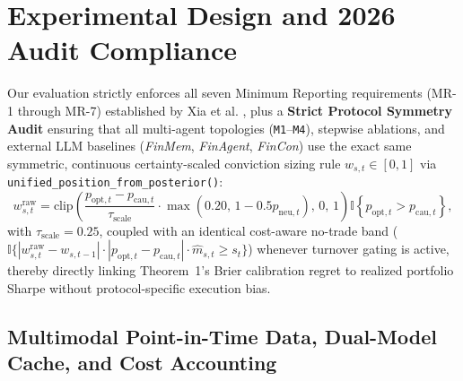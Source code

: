 \documentclass[10pt,a4paper,twocolumn]{article}
\begin{document}
\section{Experimental Design and 2026 Audit Compliance}

Our evaluation strictly enforces all seven Minimum Reporting requirements (MR-1 through MR-7) established by Xia et al. \cite{xia2026audit}, plus a \textbf{Strict Protocol Symmetry Audit} ensuring that all multi-agent topologies (\texttt{M1}--\texttt{M4}), stepwise ablations, and external LLM baselines (\textit{FinMem}, \textit{FinAgent}, \textit{FinCon}) use the exact same symmetric, continuous certainty-scaled conviction sizing rule $w_{s,t} \in [0, 1]$ via \texttt{unified\_position\_from\_posterior()}:
\begin{equation}
  w_{s,t}^{\text{raw}} = \text{clip}\!\left(\frac{p_{\text{opt},t} - p_{\text{cau},t}}{\tau_{\text{scale}}} \cdot \max\!\left(0.20, \, 1 - 0.5 p_{\text{neu},t}\right), \, 0, \, 1\right) \mathbb{I}\!\left\{p_{\text{opt},t} > p_{\text{cau},t}\right\},
\end{equation}
with $\tau_{\text{scale}} = 0.25$, coupled with an identical cost-aware no-trade band ($\mathbb{I}\{|w_{s,t}^{\text{raw}} - w_{s,t-1}| \cdot |p_{\text{opt},t} - p_{\text{cau},t}| \cdot \hat{m}_{s,t} \ge s_t\}$) whenever turnover gating is active, thereby directly linking Theorem~1's Brier calibration regret to realized portfolio Sharpe without protocol-specific execution bias.

\subsection{Multimodal Point-in-Time Data, Dual-Model Cache, and Cost Accounting}
\end{document}
